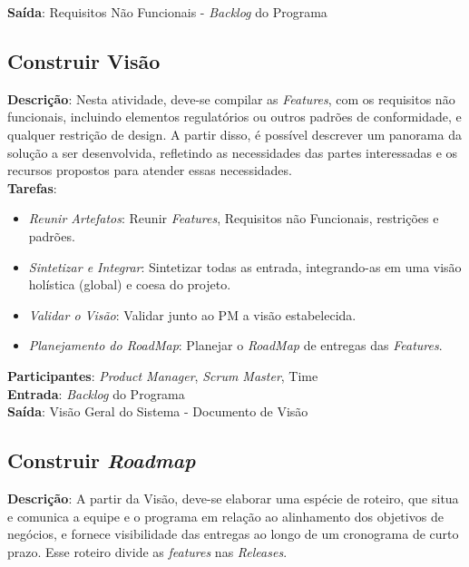   \textbf{Saída}:  Requisitos Não Funcionais - \textit{Backlog} do Programa\\

\subsection{Construir Visão}
  \textbf{Descrição}: Nesta atividade, deve-se compilar as \textit{Features}, com os requisitos não funcionais, incluindo elementos
  regulatórios ou outros padrões de conformidade, e qualquer restrição de design. A partir disso, é possível descrever um panorama da solução a
  ser desenvolvida, refletindo as necessidades das partes interessadas e os recursos propostos para atender essas necessidades. \\

  \textbf{Tarefas}:
  \begin{itemize}
   \item \indent \textit{Reunir Artefatos}: Reunir \textit{Features}, Requisitos não Funcionais, restrições e padrões.

   \item \indent \textit{Sintetizar e Integrar}: Sintetizar todas as entrada, integrando-as em uma visão holística (global) e coesa do projeto.

   \item \indent \textit{Validar o Visão}: Validar junto ao PM a visão estabelecida.

   \item \indent \textit{Planejamento do \textit{RoadMap}}: Planejar o \textit{RoadMap} de entregas das \textit{Features}.
  \end{itemize}

  \textbf{Participantes}: \textit{Product Manager}, \textit{Scrum Master}, Time \\

  \textbf{Entrada}: \textit{Backlog} do Programa \\

  \textbf{Saída}:  Visão Geral do Sistema - Documento de Visão\\

\subsection{Construir \textit{Roadmap}}
  \textbf{Descrição}: A partir da Visão, deve-se elaborar uma espécie de roteiro, que situa e comunica a equipe e o programa em relação ao
  alinhamento dos objetivos de negócios, e fornece visibilidade das entregas ao longo de um cronograma de curto prazo.
  Esse roteiro divide as \textit{features} nas \textit{Releases}. \\

